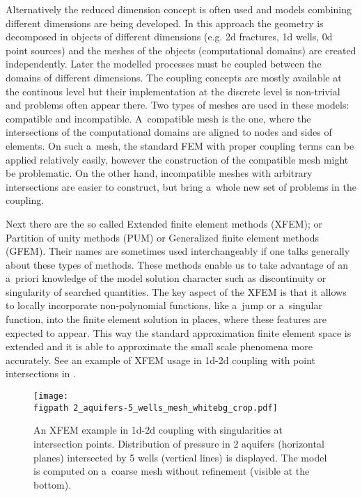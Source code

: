 Alternatively the reduced dimension concept is often used and models combining different dimensions are being developed.
In this approach the geometry is decomposed in objects of different dimensions (e.g. 2d fractures, 1d wells, 0d point sources)
and the meshes of the objects (computational domains) are created independently.
Later the modelled processes must be coupled between the domains of different dimensions.
The coupling concepts are mostly available at the continous level but their implementation
at the discrete level is non-trivial and problems often appear there.
Two types of meshes are used in these models: compatible and incompatible.
A~compatible mesh is the one, where the intersections of the computational domains are aligned to nodes and sides of elements.
On such a~mesh, the standard FEM with proper coupling terms can be applied relatively easily,
however the construction of the compatible mesh might be problematic.
On the other hand, incompatible meshes with arbitrary intersections are easier to construct, 
but bring a~whole new set of problems in the coupling.


Next there are the so called Extended finite element methods (XFEM); or Partition of unity methods (PUM) or Generalized
finite element methods (GFEM). Their names are sometimes used interchangeably if one talks generally about these types of methods. 
These methods enable us to take advantage of an a~priori knowledge of the model solution character
such as discontinuity or singularity of searched quantities.
The key aspect of the XFEM is that it allows to locally incorporate non-polynomial functions, like a~jump or a~singular function,
into the finite element solution in places, where these features are expected to appear.
This way the standard approximation finite element space is extended and it is able to approximate the small scale phenomena
more accurately.
See an example of XFEM usage in 1d-2d coupling with point intersections in .
\begin{figure}[!htb]
  \centering    
    \texttt{[image: \\figpath 2\_aquifers-5\_wells\_mesh\_whitebg\_crop.pdf]}
  \caption[XFEM example for well-aquifer model with singularities]
        { An XFEM example in 1d-2d coupling with singularities at intersection points.
            Distribution of pressure in 2 aquifers (horizontal planes) intersected by 5 wells 
            (vertical lines) is displayed. The model is computed on a~coarse mesh without refinement (visible at the bottom). }
  \label{fig:aquifers}
\end{figure}

